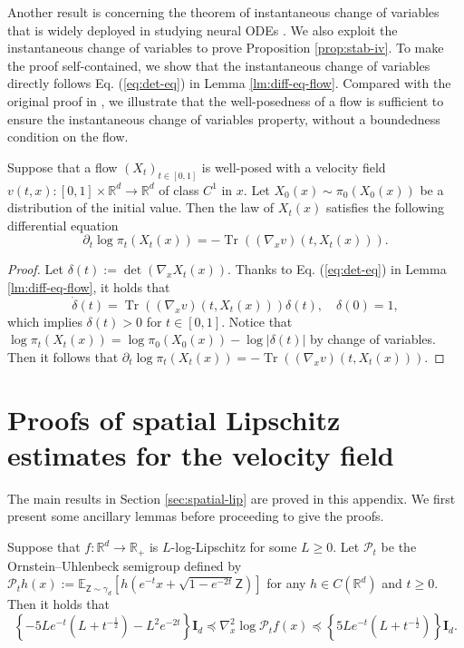 \documentclass[twoside,11pt]{article}
\def\rmI{{\mathbf{I}}}
\def\sR{{\mathbb{R}}}
\newcommand{\E}{\mathbb{E}}
\DeclareMathOperator{\Tr}{Tr}
\def\paref#1{(\ref{#1})}
\numberwithin{equation}{section}
\begin{document}
Another result is concerning the theorem of instantaneous change of variables that is widely deployed in studying neural ODEs \cite[Theorem 1]{chen2018neural}. We also exploit the instantaneous change of variables to prove Proposition \ref{prop:stab-iv}.
To make the proof self-contained, we show that the instantaneous change of variables directly follows Eq. \paref{eq:det-eq} in Lemma \ref{lm:diff-eq-flow}.
Compared with the original proof in \cite[Theorem 1]{chen2018neural}, we illustrate that the well-posedness of a flow is sufficient to ensure the instantaneous change of variables property, without a boundedness condition on the flow.

\begin{corollary}  \label{cor:change-var}
Suppose that a flow $(X_t)_{t \in [0, 1]}$ is well-posed with a velocity field $v(t, x): [0, 1] \times \sR^d \to \sR^d$ of class $C^1$ in $x$. Let $X_0(x) \sim \pi_0(X_0(x))$ be a distribution of the initial value.
Then the law of $X_t(x)$ satisfies the following differential equation
\begin{equation*}
    \partial_t \log \pi_t(X_t(x)) = - \Tr((\nabla_x v) (t, X_t(x))).
\end{equation*}
\end{corollary}

\begin{proof}
Let $\delta(t) := \det (\nabla_x X_t (x))$. Thanks to Eq. \paref{eq:det-eq} in Lemma \ref{lm:diff-eq-flow}, it holds that
\begin{equation*}
    \dot{\delta}(t) = \Tr ((\nabla_x v) (t, X_t(x))) \delta(t), \quad \delta(0) = 1,
\end{equation*}
which implies $\delta(t) > 0$ for $t \in [0, 1]$.
Notice that $\log \pi_t(X_t(x)) = \log \pi_0 (X_0(x)) - \log |\delta(t)|$ by change of variables.
Then it follows that $\partial_t \log \pi_t(X_t(x)) = - \Tr ((\nabla_x v) (t, X_t(x)))$.
\end{proof}


\section{Proofs of spatial Lipschitz estimates for the velocity field}

The main results in Section \ref{sec:spatial-lip} are proved in this appendix. We first present some ancillary lemmas before proceeding to give the proofs.

\begin{lemma}  \label{lm:log-lip}
Suppose that $f: \sR^d \to \sR_+$ is $L$-log-Lipschitz for some $L \ge 0$.
Let $\mathcal{P}_t$ be the Ornstein–Uhlenbeck semigroup defined by $\mathcal{P}_t h(x) := \E_{\mathsf{Z} \sim \gamma_d} [h(e^{-t} x + \sqrt{1- e^{-2t}} \mathsf{Z})]$ for any $h \in C(\sR^d)$ and $t \ge 0$.
Then it holds that
\begin{equation*}
    \left\{ -5L e^{-t} (L + t^{-\frac12}) - L^2 e^{-2t} \right\} \rmI_d
    \preceq \nabla^2_x \log \mathcal{P}_t f(x)
    \preceq \left\{ 5L e^{-t} (L + t^{-\frac12}) \right\} \rmI_d.
\end{equation*}
\end{lemma}
\end{document}
